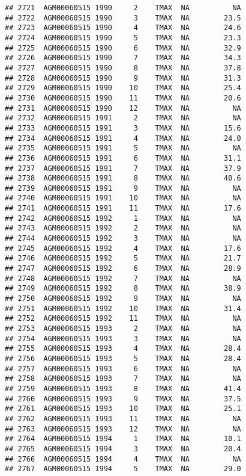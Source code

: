 \documentclass{article}\usepackage[]{graphicx}\usepackage[]{color}
\makeatletter
\newenvironment{kframe}{%
 \def\at@end@of@kframe{}%
 \ifinner\ifhmode%
  \def\at@end@of@kframe{\end{minipage}}%
  \begin{minipage}{\columnwidth}%
 \fi\fi%
 \def\FrameCommand##1{\hskip\@totalleftmargin \hskip-\fboxsep
 \colorbox{shadecolor}{##1}\hskip-\fboxsep
     \hskip-\linewidth \hskip-\@totalleftmargin \hskip\columnwidth}%
 \MakeFramed {\advance\hsize-\width
   \@totalleftmargin\z@ \linewidth\hsize
   \@setminipage}}%
 {\par\unskip\endMakeFramed%
 \at@end@of@kframe}
\newenvironment{knitrout}{}{} %
\makeatother
\begin{document}
\begin{knitrout}
\begin{kframe}
\begin{verbatim}
## 2721  AGM00060515 1990     2    TMAX  NA          NA
## 2722  AGM00060515 1990     3    TMAX  NA        23.5
## 2723  AGM00060515 1990     4    TMAX  NA        24.6
## 2724  AGM00060515 1990     5    TMAX  NA        23.3
## 2725  AGM00060515 1990     6    TMAX  NA        32.9
## 2726  AGM00060515 1990     7    TMAX  NA        34.3
## 2727  AGM00060515 1990     8    TMAX  NA        37.8
## 2728  AGM00060515 1990     9    TMAX  NA        31.3
## 2729  AGM00060515 1990    10    TMAX  NA        25.4
## 2730  AGM00060515 1990    11    TMAX  NA        20.6
## 2731  AGM00060515 1990    12    TMAX  NA          NA
## 2732  AGM00060515 1991     2    TMAX  NA          NA
## 2733  AGM00060515 1991     3    TMAX  NA        15.6
## 2734  AGM00060515 1991     4    TMAX  NA        24.0
## 2735  AGM00060515 1991     5    TMAX  NA          NA
## 2736  AGM00060515 1991     6    TMAX  NA        31.1
## 2737  AGM00060515 1991     7    TMAX  NA        37.9
## 2738  AGM00060515 1991     8    TMAX  NA        40.6
## 2739  AGM00060515 1991     9    TMAX  NA          NA
## 2740  AGM00060515 1991    10    TMAX  NA          NA
## 2741  AGM00060515 1991    11    TMAX  NA        17.6
## 2742  AGM00060515 1992     1    TMAX  NA          NA
## 2743  AGM00060515 1992     2    TMAX  NA          NA
## 2744  AGM00060515 1992     3    TMAX  NA          NA
## 2745  AGM00060515 1992     4    TMAX  NA        17.6
## 2746  AGM00060515 1992     5    TMAX  NA        21.7
## 2747  AGM00060515 1992     6    TMAX  NA        28.9
## 2748  AGM00060515 1992     7    TMAX  NA          NA
## 2749  AGM00060515 1992     8    TMAX  NA        38.9
## 2750  AGM00060515 1992     9    TMAX  NA          NA
## 2751  AGM00060515 1992    10    TMAX  NA        31.4
## 2752  AGM00060515 1992    11    TMAX  NA          NA
## 2753  AGM00060515 1993     2    TMAX  NA          NA
## 2754  AGM00060515 1993     3    TMAX  NA          NA
## 2755  AGM00060515 1993     4    TMAX  NA        28.4
## 2756  AGM00060515 1993     5    TMAX  NA        28.4
## 2757  AGM00060515 1993     6    TMAX  NA          NA
## 2758  AGM00060515 1993     7    TMAX  NA          NA
## 2759  AGM00060515 1993     8    TMAX  NA        41.4
## 2760  AGM00060515 1993     9    TMAX  NA        37.5
## 2761  AGM00060515 1993    10    TMAX  NA        25.1
## 2762  AGM00060515 1993    11    TMAX  NA          NA
## 2763  AGM00060515 1993    12    TMAX  NA          NA
## 2764  AGM00060515 1994     1    TMAX  NA        10.1
## 2765  AGM00060515 1994     3    TMAX  NA        20.4
## 2766  AGM00060515 1994     4    TMAX  NA          NA
## 2767  AGM00060515 1994     5    TMAX  NA        29.0

\end{verbatim}
\end{kframe}
\end{knitrout}
\end{document}

